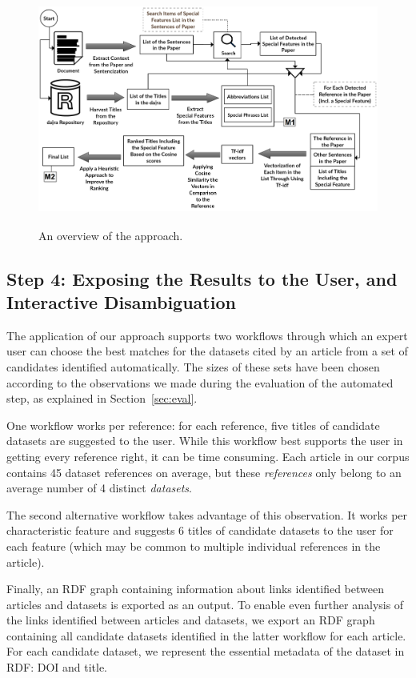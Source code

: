 \documentclass{IOS-Book-Article}
\begin{document}
\begin{figure}[h]
	\centering
	\includegraphics[height=3in]{Overwveiw_System.png}
	\caption{An overview of the approach.}
	\label{fig:Overview_of_approach}
\end{figure}

\subsection{Step 4: Exposing the Results to the User, and Interactive Disambiguation}
\label{sec:expos-results-reus}	
The application of our approach supports two workflows through which an expert user can choose the best matches for the datasets cited by an article from a set of candidates identified automatically. The sizes of these sets have been chosen according to the observations we made during the evaluation of the automated step, as explained in Section~\ref{sec:eval}.

One workflow works per reference: for each reference, five titles of candidate datasets are suggested to the user.
While this workflow best supports the user in getting every reference right, it can be time consuming.
Each article in our corpus contains 45 dataset references on average, but these \emph{references} only belong to an average number of 4 distinct \emph{datasets}.

The second alternative workflow takes advantage of this observation.
It works per characteristic feature and suggests 6 titles of candidate datasets to the user for each feature (which may be common to multiple individual references in the article). 

Finally, an RDF graph containing information about links identified between articles and datasets is exported as an output.
To enable even further analysis of the links identified between articles and datasets, we export an RDF graph containing all candidate datasets identified in the latter workflow for each article.
For each candidate dataset, we represent the essential metadata of the dataset in RDF: DOI and title.
\end{document}

